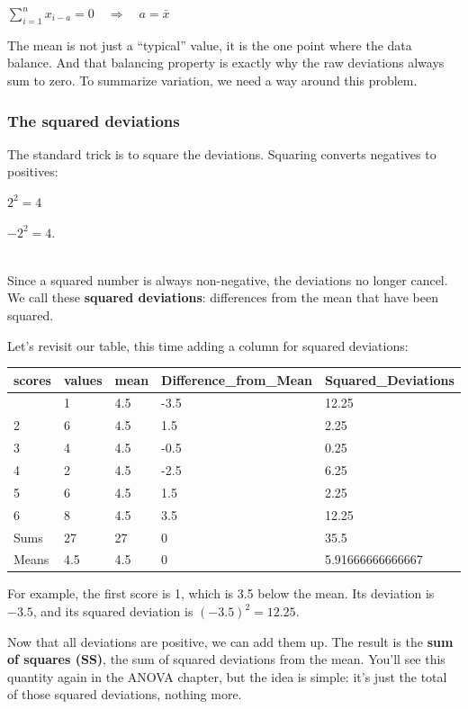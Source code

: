 \documentclass[
  letterpaper,
  DIV=11,
  numbers=noendperiod]{scrreprt}
\begin{document}
\(\sum_{i=1}^{n}x_{{i}-a} = 0 \quad \Rightarrow \quad a = \bar{x}\)

The mean is not just a ``typical'' value, it is the one point where the
data balance. And that balancing property is exactly why the raw
deviations always sum to zero. To summarize variation, we need a way
around this problem.

\subsubsection{The squared deviations}\label{the-squared-deviations}

The standard trick is to square the deviations. Squaring converts
negatives to positives:

\(2^2 = 4\)

\(-2^2 = 4\).\\
\strut \\
Since a squared number is always non-negative, the deviations no longer
cancel. We call these \textbf{squared deviations}: differences from the
mean that have been squared.

Let's revisit our table, this time adding a column for squared
deviations:

\begin{longtable}[]{@{}lllll@{}}
\toprule\noalign{}
scores & values & mean & Difference\_from\_Mean & Squared\_Deviations \\
\midrule\noalign{}
\endhead
\bottomrule\noalign{}
\endlastfoot
1 & 1 & 4.5 & -3.5 & 12.25 \\
2 & 6 & 4.5 & 1.5 & 2.25 \\
3 & 4 & 4.5 & -0.5 & 0.25 \\
4 & 2 & 4.5 & -2.5 & 6.25 \\
5 & 6 & 4.5 & 1.5 & 2.25 \\
6 & 8 & 4.5 & 3.5 & 12.25 \\
Sums & 27 & 27 & 0 & 35.5 \\
Means & 4.5 & 4.5 & 0 & 5.91666666666667 \\
\end{longtable}

For example, the first score is 1, which is 3.5 below the mean. Its
deviation is \(−3.5\), and its squared deviation is \((−3.5)^2=12.25\).

Now that all deviations are positive, we can add them up. The result is
the \textbf{sum of squares (SS)}, the sum of squared deviations from the
mean. You'll see this quantity again in the ANOVA chapter, but the idea
is simple: it's just the total of those squared deviations, nothing
more.
\end{document}
